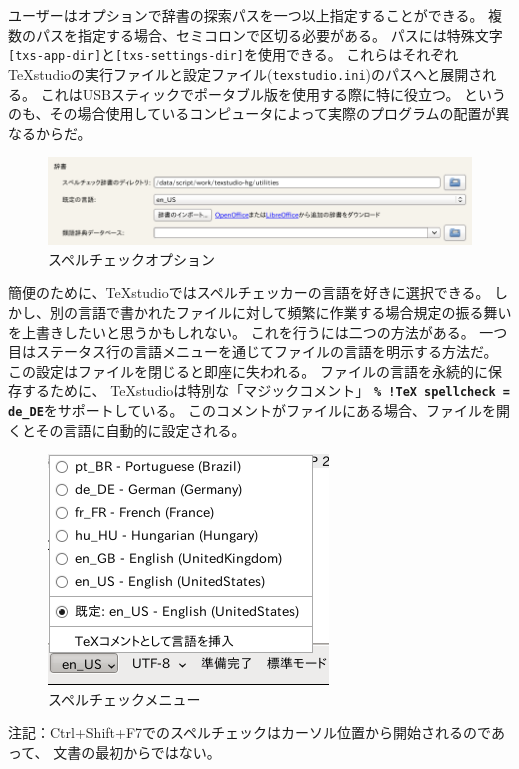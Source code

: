 ユーザーはオプションで辞書の探索パスを一つ以上指定することができる。
複数のパスを指定する場合、セミコロンで区切る必要がある。
パスには特殊文字\verb+[txs-app-dir]+と\verb+[txs-settings-dir]+を使用できる。
これらはそれぞれTeXstudioの実行ファイルと設定ファイル(\verb+texstudio.ini+)のパスへと展開される。
これはUSBスティックでポータブル版を使用する際に特に役立つ。
というのも、その場合使用しているコンピュータによって実際のプログラムの配置が異なるからだ。

\begin{figure}[H]
  \centering
  \includegraphics[width=.8\linewidth]{spellcheck_options.png}
  \caption{スペルチェックオプション}
\end{figure}

簡便のために、TeXstudioではスペルチェッカーの言語を好きに選択できる。
しかし、別の言語で書かれたファイルに対して頻繁に作業する場合規定の振る舞いを上書きしたいと思うかもしれない。
これを行うには二つの方法がある。
一つ目はステータス行の言語メニューを通じてファイルの言語を明示する方法だ。
この設定はファイルを閉じると即座に失われる。
ファイルの言語を永続的に保存するために、
TeXstudioは特別な「マジックコメント」
\textbf{\texttt{\% !TeX spellcheck = de\_DE}}をサポートしている。
このコメントがファイルにある場合、ファイルを開くとその言語に自動的に設定される。

\begin{figure}[H]
  \centering
  \includegraphics{spellcheck_menu.png}
  \caption{スペルチェックメニュー}
\end{figure}

注記：Ctrl+Shift+F7でのスペルチェックはカーソル位置から開始されるのであって、
文書の最初からではない。


